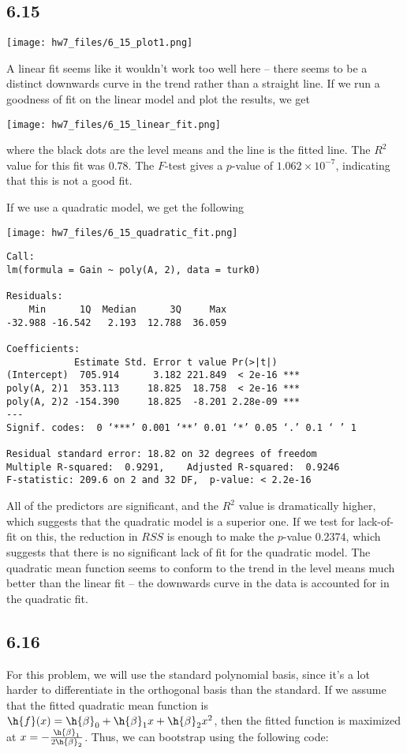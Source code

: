 \documentclass{article}
\begin{document}
\subsection*{6.15}
\texttt{[image: hw7\_files/6\_15\_plot1.png]}

A linear fit seems like it wouldn't work too well here -- there seems to be a distinct downwards curve in the trend rather than a straight line.
If we run a goodness of fit on the linear model and plot the results, we get 

\texttt{[image: hw7\_files/6\_15\_linear\_fit.png]}

where the black dots are the level means and the line is the fitted line. The $R^2$ value for this fit was $0.78$. The $F$-test gives a $p$-value of $1.062\times10^{-7}$, indicating that this is not a good fit.

If we use a quadratic model, we get the following

\texttt{[image: hw7\_files/6\_15\_quadratic\_fit.png]}

\begin{verbatim}
Call:
lm(formula = Gain ~ poly(A, 2), data = turk0)

Residuals:
    Min      1Q  Median      3Q     Max 
-32.988 -16.542   2.193  12.788  36.059 

Coefficients:
            Estimate Std. Error t value Pr(>|t|)    
(Intercept)  705.914      3.182 221.849  < 2e-16 ***
poly(A, 2)1  353.113     18.825  18.758  < 2e-16 ***
poly(A, 2)2 -154.390     18.825  -8.201 2.28e-09 ***
---
Signif. codes:  0 ‘***’ 0.001 ‘**’ 0.01 ‘*’ 0.05 ‘.’ 0.1 ‘ ’ 1

Residual standard error: 18.82 on 32 degrees of freedom
Multiple R-squared:  0.9291,    Adjusted R-squared:  0.9246 
F-statistic: 209.6 on 2 and 32 DF,  p-value: < 2.2e-16
\end{verbatim}
All of the predictors are significant, and the $R^2$ value is dramatically higher, which suggests that the quadratic model is a superior one. If we test for lack-of-fit on this, the reduction in $RSS$ is enough to make the $p$-value $0.2374$, which suggests that there is no significant lack of fit for the quadratic model.
The quadratic mean function seems to conform to the trend in the level means much better than the linear fit -- the downwards curve in the data is accounted for in the quadratic fit.
\subsection*{6.16}
For this problem, we will use the standard polynomial basis, since it's a lot harder to differentiate in the orthogonal basis than the standard. If we assume that the fitted quadratic mean function is $\h{f}(x)=\h{\beta}_0+\h{\beta}_1x+\h{\beta}_2x^2$, then the fitted function is maximized at $x=-\frac{\h{\beta}_1}{2\h{\beta}_2}$. Thus, we can bootstrap using the following code:
\end{document}
